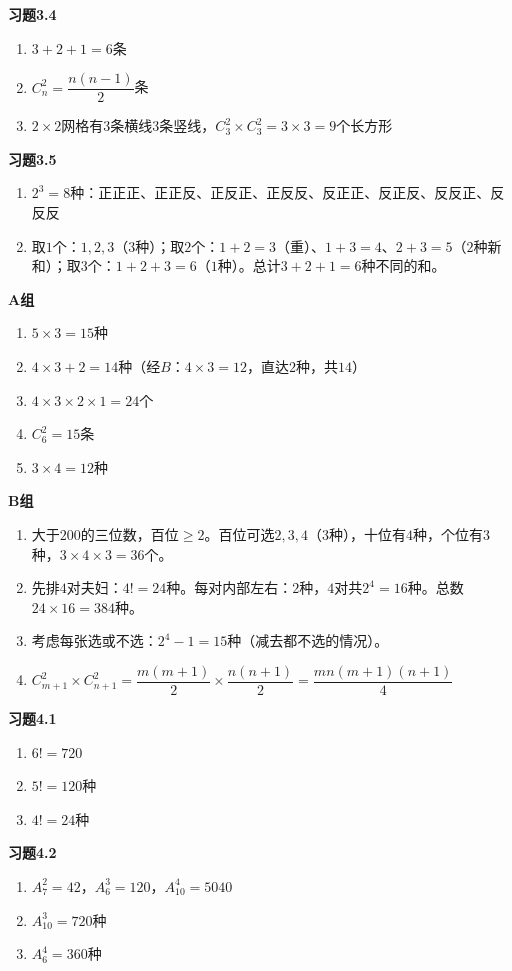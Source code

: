 \textbf{习题3.4}
\begin{enumerate}
\item $3+2+1=6$条
\item $C_n^2=\dfrac{n(n-1)}{2}$条
\item $2\times2$网格有$3$条横线$3$条竖线，$C_3^2\times C_3^2=3\times3=9$个长方形
\end{enumerate}

\textbf{习题3.5}
\begin{enumerate}
\item $2^3=8$种：正正正、正正反、正反正、正反反、反正正、反正反、反反正、反反反
\item 取$1$个：$1,2,3$（$3$种）；取$2$个：$1+2=3$（重）、$1+3=4$、$2+3=5$（$2$种新和）；取$3$个：$1+2+3=6$（$1$种）。总计$3+2+1=6$种不同的和。
\end{enumerate}

\textbf{A组}
\begin{enumerate}
\item $5\times3=15$种
\item $4\times3+2=14$种（经$B$：$4\times3=12$，直达$2$种，共$14$）
\item $4\times3\times2\times1=24$个
\item $C_6^2=15$条
\item $3\times4=12$种
\end{enumerate}

\textbf{B组}
\begin{enumerate}
\item 大于$200$的三位数，百位$\ge2$。百位可选$2,3,4$（$3$种），十位有$4$种，个位有$3$种，$3\times4\times3=36$个。
\item 先排$4$对夫妇：$4!=24$种。每对内部左右：$2$种，$4$对共$2^4=16$种。总数$24\times16=384$种。
\item 考虑每张选或不选：$2^4-1=15$种（减去都不选的情况）。
\item $C_{m+1}^2\times C_{n+1}^2=\dfrac{m(m+1)}{2}\times\dfrac{n(n+1)}{2}=\dfrac{mn(m+1)(n+1)}{4}$
\end{enumerate}


\textbf{习题4.1}
\begin{enumerate}
\item $6!=720$
\item $5!=120$种
\item $4!=24$种
\end{enumerate}

\textbf{习题4.2}
\begin{enumerate}
\item $A_7^2=42$，$A_6^3=120$，$A_{10}^4=5040$
\item $A_{10}^3=720$种
\item $A_6^4=360$种
\end{enumerate}

